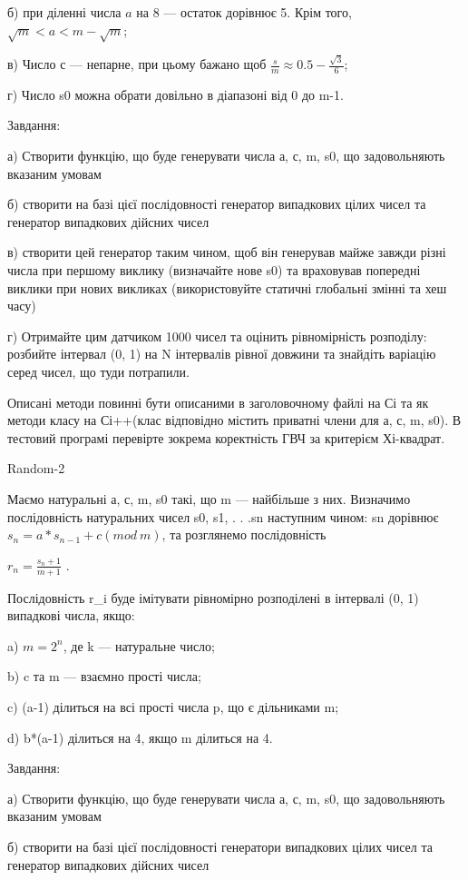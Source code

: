 \documentclass[]{article}
\begin{document}
б) при діленні числа \(a\) на 8 --- остаток дорівнює 5. Крім того,
\(\sqrt{m} < a < m - \sqrt{m}\);

в) Число с --- непарне, при цьому бажано щоб
\(\frac{s}{m} \approx 0.5 - \frac{\sqrt{3}}{6}\);

г) Число s0 можна обрати довільно в діапазоні від 0 до m-1.

Завдання:

а) Створити функцію, що буде генерувати числа а, с, m, s0, що
задовольняють вказаним умовам

б) створити на базі цієї послідовності генератор випадкових цілих чисел
та генератор випадкових дійсних чисел

в) створити цей генератор таким чином, щоб він генерував майже завжди
різні числа при першому виклику (визначайте нове s0) та враховував
попередні виклики при нових викликах (використовуйте статичні глобальні
змінні та хеш часу)

г) Отримайте цим датчиком 1000 чисел та оцінить рівномірність розподілу:
розбийте інтервал (0, 1) на N інтервалів рівної довжини та знайдіть
варіацію серед чисел, що туди потрапили.

Описані методи повинні бути описаними в заголовочному файлі на Сі та як
методи класу на Сі++(клас відповідно містить приватні члени для а, с, m,
s0). В тестовий програмі перевірте зокрема коректність ГВЧ за критерієм
Хі-квадрат.

Random-2

Маємо натуральні а, с, m, s0 такі, що m --- найбільше з них. Визначимо
послідовність натуральних чисел s0, s1, . . .sn наступним чином: sn
дорівнює \(s_{n} = a*s_{n - 1} + c(mod\ m)\), та розглянемо
послідовність

\(r_{n} = \frac{s_{n} + 1}{m + 1}\) .

Послідовність r\_i буде імітувати рівномірно розподілені в інтервалі (0,
1) випадкові числа, якщо:

a) \({m = 2}^{n}\), де k --- натуральне число;

b) c та m --- взаємно прості числа;

c) (a-1) ділиться на всі прості числа p, що є дільниками m;

d) b*(a-1) ділиться на 4, якщо m ділиться на 4.

Завдання:

а) Створити функцію, що буде генерувати числа а, с, m, s0, що
задовольняють вказаним умовам

б) створити на базі цієї послідовності генератори випадкових цілих чисел
та генератор випадкових дійсних чисел
\end{document}
